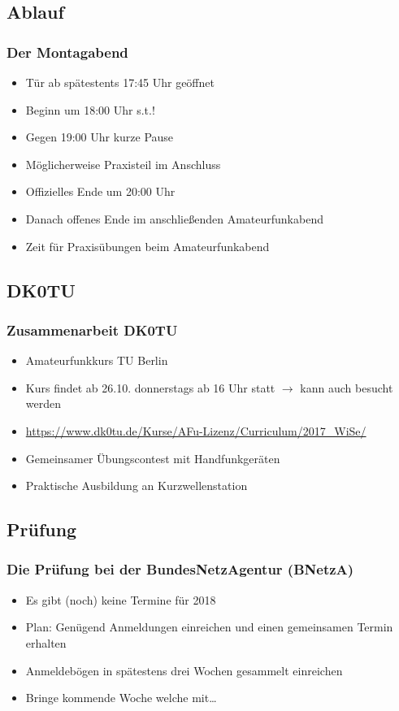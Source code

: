 \subsection{Ablauf}

\begin{frame}
  \frametitle{Der Montagabend}

  \begin{itemize}
    \item Tür ab spätestents 17:45 Uhr geöffnet
    \item Beginn um 18:00 Uhr s.t.!
    \item Gegen 19:00 Uhr kurze Pause
    \item Möglicherweise Praxisteil im Anschluss
    \item Offizielles Ende um 20:00 Uhr
    \item Danach offenes Ende im anschließenden Amateurfunkabend
    \item Zeit für Praxisübungen beim Amateurfunkabend
  \end{itemize}
\end{frame}

\subsection{DK0TU}

\begin{frame}
  \frametitle{Zusammenarbeit DK0TU}
  \begin{itemize}
    \item Amateurfunkkurs TU Berlin
    \item Kurs findet ab 26.10. donnerstags ab 16 Uhr statt $\rightarrow$ kann auch besucht werden
    \item \ExternalLink\url{https://www.dk0tu.de/Kurse/AFu-Lizenz/Curriculum/2017_WiSe/}
    \item Gemeinsamer Übungscontest mit Handfunkgeräten
    \item Praktische Ausbildung an Kurzwellenstation
  \end{itemize}
\end{frame}


\subsection{Prüfung}

\begin{frame}
  \frametitle{Die Prüfung bei der BundesNetzAgentur (BNetzA)}

  \begin{itemize}
    \item Es gibt (noch) keine Termine für 2018
    \item Plan: Genügend Anmeldungen einreichen und einen gemeinsamen Termin erhalten
    \item Anmeldebögen in spätestens drei Wochen gesammelt einreichen
    \item Bringe kommende Woche welche mit\ldots
  \end{itemize}
\end{frame}


